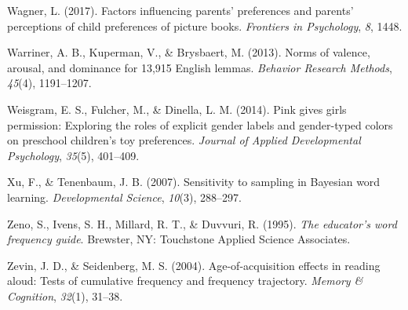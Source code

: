 \documentclass[english,,man,floatsintext]{apa6}
\begin{document}
\leavevmode\hypertarget{ref-wagner2017factors}{}%
Wagner, L. (2017). Factors influencing parents' preferences and parents' perceptions of child preferences of picture books. \emph{Frontiers in Psychology}, \emph{8}, 1448.

\leavevmode\hypertarget{ref-warriner2013norms}{}%
Warriner, A. B., Kuperman, V., \& Brysbaert, M. (2013). Norms of valence, arousal, and dominance for 13,915 English lemmas. \emph{Behavior Research Methods}, \emph{45}(4), 1191--1207.

\leavevmode\hypertarget{ref-weisgram2014pink}{}%
Weisgram, E. S., Fulcher, M., \& Dinella, L. M. (2014). Pink gives girls permission: Exploring the roles of explicit gender labels and gender-typed colors on preschool children's toy preferences. \emph{Journal of Applied Developmental Psychology}, \emph{35}(5), 401--409.

\leavevmode\hypertarget{ref-xu2007b}{}%
Xu, F., \& Tenenbaum, J. B. (2007). Sensitivity to sampling in Bayesian word learning. \emph{Developmental Science}, \emph{10}(3), 288--297.

\leavevmode\hypertarget{ref-tasa_norms}{}%
Zeno, S., Ivens, S. H., Millard, R. T., \& Duvvuri, R. (1995). \emph{The educator's word frequency guide}. Brewster, NY: Touchstone Applied Science Associates.

\leavevmode\hypertarget{ref-zevin2004age}{}%
Zevin, J. D., \& Seidenberg, M. S. (2004). Age-of-acquisition effects in reading aloud: Tests of cumulative frequency and frequency trajectory. \emph{Memory \& Cognition}, \emph{32}(1), 31--38.
\end{document}
